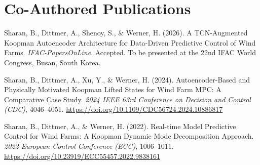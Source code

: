 \documentclass[11pt,a4paper]{article}
\begin{document}
   \section*{Co-Authored Publications}
   
   \begin{description}[leftmargin=0pt]
       
       \item Sharan, B., Dittmer, A., Shenoy, S., \& Werner, H. (2026).
       A {TCN}-Augmented Koopman Autoencoder Architecture for
       Data-Driven Predictive Control of Wind Farms.
       \textit{IFAC-PapersOnLine}.
       Accepted. To be presented at the 22nd IFAC World Congress, Busan, South Korea.
       
       \item Sharan, B., Dittmer, A., Xu, Y., \& Werner, H. (2024).
       Autoencoder-Based and Physically Motivated Koopman Lifted States
       for Wind Farm MPC: A Comparative Case Study.
       \textit{2024 IEEE 63rd Conference on Decision and Control (CDC)}, 4046--4051.
       \url{https://doi.org/10.1109/CDC56724.2024.10886817}
       
       \item Sharan, B., Dittmer, A., \& Werner, H. (2022).
       Real-time Model Predictive Control for Wind Farms:
       A Koopman Dynamic Mode Decomposition Approach.
       \textit{2022 European Control Conference (ECC)}, 1006--1011.
       \url{https://doi.org/10.23919/ECC55457.2022.9838161}
       
   \end{description}
    
      
\end{document}

